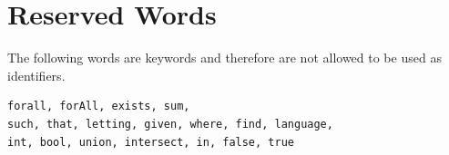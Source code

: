 \documentclass[a4paper]{article}
\begin{document}
\section{Reserved Words} \label{app:reservedwords}

The following words are keywords and therefore are not allowed to be used as identifiers. 

\begin{verbatim}
forall, forAll, exists, sum,  
such, that, letting, given, where, find, language, 
int, bool, union, intersect, in, false, true
\end{verbatim}




\end{document}
